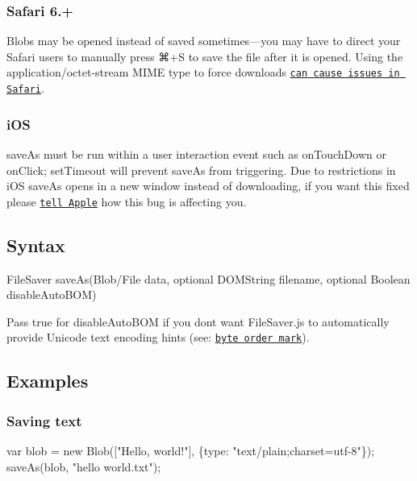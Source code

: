 \subsubsection*{Safari 6.+}

Blobs may be opened instead of saved sometimes—you may have to direct your Safari users to manually press {\ttfamily ⌘}+{\ttfamily S} to save the file after it is opened. Using the {\ttfamily application/octet-\/stream} M\+I\+ME type to force downloads \href{https://github.com/eligrey/FileSaver.js/issues/12#issuecomment-47247096}{\tt can cause issues in Safari}.

\subsubsection*{i\+OS}

save\+As must be run within a user interaction event such as on\+Touch\+Down or on\+Click; set\+Timeout will prevent save\+As from triggering. Due to restrictions in i\+OS save\+As opens in a new window instead of downloading, if you want this fixed please \href{https://bugs.webkit.org/show_bug.cgi?id=102914}{\tt tell Apple} how this bug is affecting you.

\subsection*{Syntax }


\begin{DoxyCode}
FileSaver saveAs(Blob/File data, optional DOMString filename, optional Boolean disableAutoBOM)
\end{DoxyCode}


Pass {\ttfamily true} for {\ttfamily disable\+Auto\+B\+OM} if you don\textquotesingle{}t want File\+Saver.\+js to automatically provide Unicode text encoding hints (see\+: \href{https://en.wikipedia.org/wiki/Byte_order_mark}{\tt byte order mark}).

\subsection*{Examples }

\subsubsection*{Saving text}


\begin{DoxyCode}
var blob = new Blob(["Hello, world!"], \{type: "text/plain;charset=utf-8"\});
saveAs(blob, "hello world.txt");
\end{DoxyCode}


